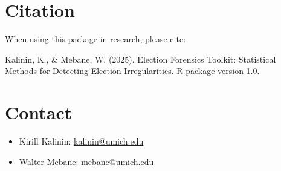 \documentclass{article}
\begin{document}
\section{Citation}
When using this package in research, please cite:

Kalinin, K., \& Mebane, W. (2025). Election Forensics Toolkit: Statistical Methods for Detecting Election Irregularities. R package version 1.0.

\section{Contact}
\begin{itemize}
    \item Kirill Kalinin: \href{mailto:kalinin@umich.edu}{kalinin@umich.edu}
    \item Walter Mebane: \href{mailto:mebane@umich.edu}{mebane@umich.edu}
\end{itemize}
\end{document}
